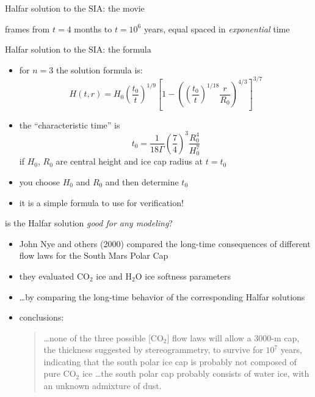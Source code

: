 \begin{frame}{Halfar solution to the SIA: the movie}
\label{slide:plothalfar}


\par
\scriptsize 
frames from $t=4$ months to $t = 10^6$ years, equal spaced in \emph{exponential} time
\end{frame}


\begin{frame}{Halfar solution to the SIA: the formula}

\begin{itemize}
\item for $n=3$ the solution formula is:
  $$H(t,r) = H_0 \left(\frac{t_0}{t}\right)^{1/9} \left[1 - \left(\left(\frac{t_0}{t}\right)^{1/18} \frac{r}{R_0}\right)^{4/3}\right]^{3/7}$$
\item the ``characteristic time'' is
  $$t_0 = \frac{1}{18 \Gamma} \left(\frac{7}{4}\right)^3 \frac{R_0^4}{H_0^{7}}$$
if $H_0$, $R_0$ are central height and ice cap radius at $t=t_0$
\item you choose $H_0$ and $R_0$ and then determine $t_0$
\item it is a simple formula to use for verification!
\end{itemize}
\end{frame}


\begin{frame}{is the Halfar solution \emph{good for any modeling}?}

\begin{itemize}
\item John Nye and others (2000) compared the long-time consequences of different flow laws for the South Mars Polar Cap
\item they evaluated $\text{CO}_2$ ice and $\text{H}_2\text{O}$ ice softness parameters
\item \dots by comparing the long-time behavior of the corresponding Halfar solutions
\item conclusions:
  \begin{quote}
  \dots none of the three possible [$\text{CO}_2$] flow laws will allow a 3000-m cap, the thickness suggested by stereogrammetry, to survive for $10^7$ years, indicating that the south polar ice cap is probably not composed of pure $\text{CO}_2$ ice \dots the south polar cap probably consists of water ice, with an unknown admixture of dust.
  \end{quote}
\end{itemize}

\end{frame}



